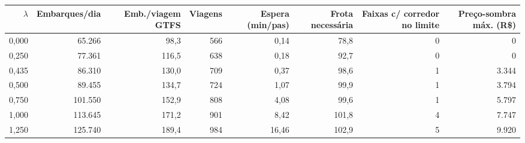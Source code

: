 \begin{tabular}{rrrrrrrr}
\toprule
$\lambda$ & Embarques/dia & Emb./viagem GTFS & Viagens & Espera (min/pas) & Frota necessária & Faixas c/ corredor no limite & Preço-sombra máx. (R\$) \\
\midrule
0{,}000 & 65.266 & 98{,}3 & 566 & 0{,}14 & 78{,}8 & 0 & 0 \\
0{,}250 & 77.361 & 116{,}5 & 638 & 0{,}18 & 92{,}7 & 0 & 0 \\
0{,}435 & 86.310 & 130{,}0 & 709 & 0{,}37 & 98{,}6 & 1 & 3.344 \\
0{,}500 & 89.455 & 134{,}7 & 724 & 1{,}07 & 99{,}9 & 1 & 3.794 \\
0{,}750 & 101.550 & 152{,}9 & 808 & 4{,}08 & 99{,}6 & 1 & 5.797 \\
1{,}000 & 113.645 & 171{,}2 & 901 & 8{,}42 & 101{,}8 & 4 & 7.747 \\
1{,}250 & 125.740 & 189{,}4 & 984 & 16{,}46 & 102{,}9 & 5 & 9.920 \\
\bottomrule
\end{tabular}

